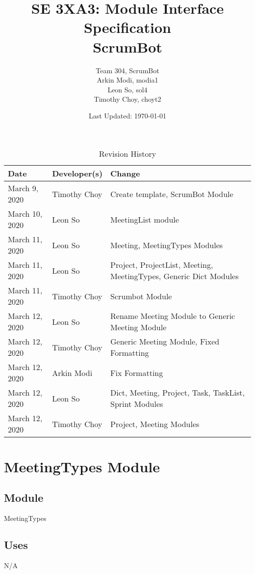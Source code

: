\documentclass[12pt, titlepage]{article}
\title{SE 3XA3: Module Interface Specification\\ScrumBot}
\author{
    Team 304, ScrumBot
        \\ Arkin Modi, modia1
        \\ Leon So, sol4
        \\ Timothy Choy, choyt2
}
\date{Last Updated: \today}
\begin{document}
\maketitle

\begin{table}[H]
    \caption{Revision History} \label{TblRevisionHistory}
    \begin{tabularx}{\textwidth}{llX}
        \toprule
            \textbf{Date} & \textbf{Developer(s)} & \textbf{Change}\\
        \midrule
            March 9, 2020 & Timothy Choy & Create template, ScrumBot Module\\
            March 10, 2020 & Leon So & MeetingList module\\
            March 11, 2020 & Leon So & Meeting, MeetingTypes Modules\\
            March 11, 2020 & Leon So & Project, ProjectList, Meeting, MeetingTypes, Generic Dict Modules\\
            March 11, 2020 & Timothy Choy & Scrumbot Module\\
            March 12, 2020 & Leon So & Rename Meeting Module to Generic Meeting Module\\
            March 12, 2020 & Timothy Choy & Generic Meeting Module, Fixed Formatting\\
            March 12, 2020 & Arkin Modi & Fix Formatting\\
            March 12, 2020 & Leon So & Dict, Meeting, Project, Task, TaskList, Sprint Modules\\
            March 12, 2020 & Timothy Choy & Project, Meeting Modules\\
        \bottomrule
    \end{tabularx}
\end{table}

\newpage

\section* {MeetingTypes Module}

\subsection* {Module}
MeetingTypes

\subsection*{Uses}
N/A
\end{document}
